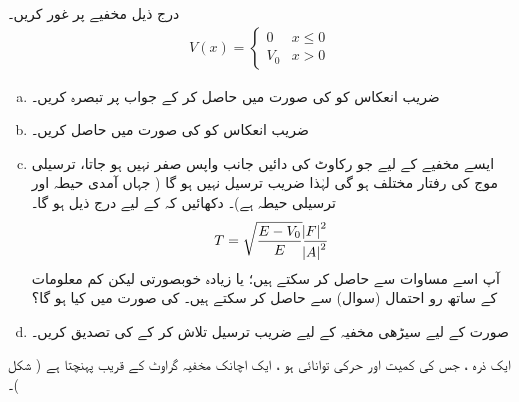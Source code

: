  درج ذیل  مخفیے  پر غور کریں۔
\begin{align*}
V(x)=
\begin{cases}
0 & x\le 0\\
V_{0}&x> 0
\end{cases}
\end{align*}
%
\begin{enumerate}[a.]
\item
 ضریب انعکاس کو   کی  صورت میں حاصل کر کے جواب پر تبصرہ کریں۔ 
\item
ضریب انعکاس  کو  کی  صورت  میں حاصل کریں۔ 
\item
ایسے مخفیے  کے لیے جو رکاوٹ کی  دائیں جانب واپس صفر نہیں ہو جاتا، ترسیلی موج کی رفتار مختلف ہو گی لہٰذا ضریب ترسیل نہیں ہو گا ( جہاں آمدی حیطہ اور ترسیلی حیطہ ہے)۔ دکھائیں کہ  کے لیے درج ذیل ہو گا۔
\begin{align}
 T=\sqrt{\frac{E-V_{0}}{E}}\frac{\abs{F}^{2}}{\abs{A}^{2}} 
 \end{align}
  آپ اسے مساوات سے حاصل کر سکتے ہیں؛ یا زیادہ خوبصورتی لیکن کم معلومات کے ساتھ رو  احتمال  (سوال) سے حاصل کر سکتے ہیں۔  کی صورت میں   کیا ہو گا؟
\item

صورت  کے لیے سیڑھی مخفیہ کے لیے ضریب ترسیل تلاش کر کے  کی تصدیق کریں۔
\end{enumerate}
ایک ذرہ ، جس کی کمیت  اور حرکی توانائی  ہو ،  ایک اچانک مخفیہ گراوٹ کے قریب پہنچتا ہے
 ( شکل )۔ 

